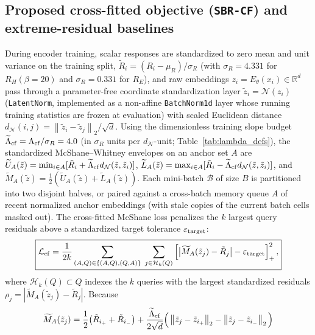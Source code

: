 \documentclass[preprint,11pt,a4paper]{elsarticle}
\newcommand{\R}{\mathbb{R}}
\newcommand{\norm}[1]{\left\lVert #1\right\rVert}
\newcommand{\relu}[1]{\left[#1\right]_{+}}
\begin{document}
\subsection{Proposed cross-fitted objective (\texttt{SBR-CF}) and extreme-residual baselines}
\label{sec:loss}

During encoder training, scalar responses are standardized to zero mean and unit variance on the training split, $\tilde R_i = (R_i - \mu_R)/\sigma_R$ (with $\sigma_R=4.331$ for $R_H(\beta=20)$ and $\sigma_R=0.331$ for $R_E$), and raw embeddings $z_i=E_\theta(x_i)\in\R^d$ pass through a parameter-free coordinate standardization layer $\tilde z_i = \mathcal N(z_i)$ (\texttt{LatentNorm}, implemented as a non-affine \texttt{BatchNorm1d} layer whose running training statistics are frozen at evaluation) with scaled Euclidean distance $d_{\mathcal N}(i,j)=\norm{\tilde z_i-\tilde z_j}_2/\sqrt d$. Using the dimensionless training slope budget $\widetilde\Lambda_{\rm cf}=\Lambda_{\rm cf}/\sigma_R=4.0$ (in $\sigma_R$ units per $d_{\mathcal N}$-unit; Table~\ref{tab:lambda_defs}), the standardized McShane--Whitney envelopes on an anchor set $A$ are $\widetilde U_A(\tilde z)=\min_{i\in A}[\tilde R_i+\widetilde\Lambda_{\rm cf}d_{\mathcal N}(\tilde z,\tilde z_i)]$, $\widetilde L_A(\tilde z)=\max_{i\in A}[\tilde R_i-\widetilde\Lambda_{\rm cf}d_{\mathcal N}(\tilde z,\tilde z_i)]$, and $\widetilde M_A(\tilde z)=\frac12(\widetilde U_A(\tilde z)+\widetilde L_A(\tilde z))$. Each mini-batch $\mathcal B$ of size $B$ is partitioned into two disjoint halves, or paired against a cross-batch memory queue $A$ of recent normalized anchor embeddings (with stale copies of the current batch cells masked out). The cross-fitted McShane loss penalizes the $k$ largest query residuals above a standardized target tolerance $\varepsilon_{\rm target}$:
\begin{equation}
\boxed{
\mathcal L_{\rm cf}
=
\frac{1}{2k}
\sum_{(A,Q)\in\{(A,Q),(Q,A)\}}\;
\sum_{j\in\mathcal H_k(Q)}
\relu{\big|\widetilde M_A(\tilde z_j)-\tilde R_j\big|-\varepsilon_{\rm target}}^2,
}
\label{eq:cf-loss}
\end{equation}
where $\mathcal H_k(Q)\subset Q$ indexes the $k$ queries with the largest standardized residuals $\rho_j=|\widetilde M_A(\tilde z_j)-\tilde R_j|$. Because
\[
\widetilde M_A(\tilde z_j)
= \frac12\big(\tilde R_{i_+}+\tilde R_{i_-}\big)
+ \frac{\widetilde\Lambda_{\rm cf}}{2\sqrt d}\Big(\norm{\tilde z_j-\tilde z_{i_+}}_2-\norm{\tilde z_j-\tilde z_{i_-}}_2\Big)
\]
\end{document}
